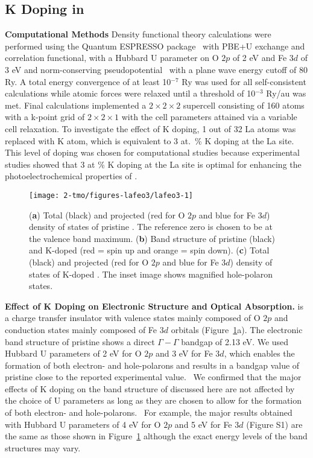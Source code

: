 \subsection{K Doping in }

\textbf{Computational Methods} Density functional theory calculations were performed using the Quantum ESPRESSO package~\cite{QE1} with PBE+U exchange and correlation functional, with a Hubbard U parameter on O $2p$ of 2 eV and Fe $3d$ of 3 eV and norm-conserving pseudopotential~\cite{ONCV1} with a plane wave energy cutoff of 80 Ry. A total energy convergence of at least 10$^{-7}$ Ry was used for all self-consistent calculations while atomic forces were relaxed until a threshold of 10$^{-3}$ Ry/au was met. Final calculations implemented a $2\times 2\times 2$ supercell consisting of 160 atoms with a k-point grid of $2\times 2\times 1$ with the cell parameters attained via a variable cell relaxation. To investigate the effect of K doping, 1 out of 32 La atoms was replaced with K atom, which is equivalent to 3 at.\ \% K doping at the La site. This level of doping was chosen for computational studies because experimental studies showed that 3 at \% K doping at the La site is optimal for enhancing the photoelectrochemical properties of .


\begin{figure}
    \centering
    \texttt{[image: 2-tmo/figures-lafeo3/lafeo3-1]}
    \caption{
        (\textbf{a}) Total (black) and projected (red for O $2p$ and blue for Fe $3d$) density of states of pristine . The reference zero is chosen to be at the valence band maximum. (\textbf{b}) Band structure of pristine (black) and K-doped  (red = spin up and orange = spin down). (\textbf{c}) Total (black) and projected (red for O $2p$ and blue for Fe $3d$) density of states of K-doped . The inset image shows magnified hole-polaron states.
    }
    \label{lafeo3:fig:prist}
\end{figure}


\textbf{Effect of K Doping on Electronic Structure and Optical Absorption.}	 is a charge transfer insulator with valence states mainly composed of O $2p$ and conduction states mainly composed of Fe $3d$ orbitals (Figure~\ref{lafeo3:fig:prist}a). The electronic band structure of pristine  shows a direct $\Gamma-\Gamma$ bandgap of 2.13 eV. We used Hubbard U parameters of 2 eV for O $2p$ and 3 eV for Fe $3d$, which enables the formation of both electron- and hole-polarons and results in a bandgap value of pristine  close to the reported experimental value.~\cite{wheeler2017photoelectrochemical} We confirmed that the major effects of K doping on the band structure of  discussed here are not affected by the choice of U parameters as long as they are chosen to allow for the formation of both electron- and hole-polarons.~\cite{smart2018mechanistic,seo2018role,smart2017effect,wu2018combining} For example, the major results obtained with Hubbard U parameters of 4 eV for O $2p$ and 5 eV for Fe $3d$ (Figure S1) are the same as those shown in Figure~\ref{lafeo3:fig:prist} although the exact energy levels of the band structures may vary.

